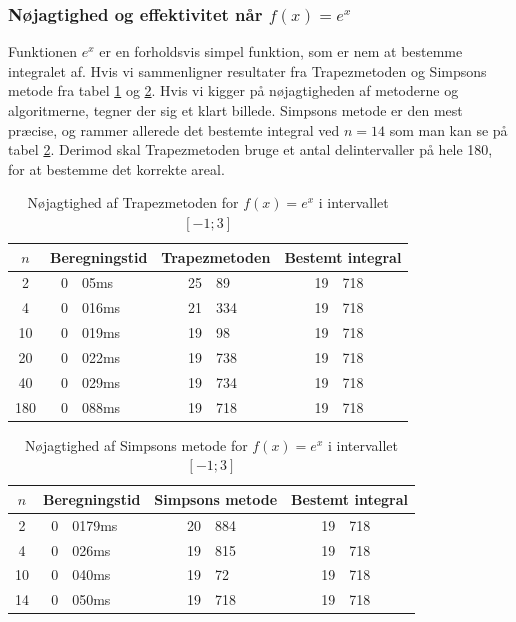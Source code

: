 \documentclass[12pt]{article}
\numberwithin{equation}{section}
\begin{document}
\subsubsection{Nøjagtighed og effektivitet når $f(x)=e^x$}
Funktionen $e^x$ er en forholdsvis simpel funktion, som er nem at bestemme integralet af. Hvis vi sammenligner resultater fra Trapezmetoden og Simpsons metode fra tabel \ref{tab:trapezmetodenex} og \ref{tab:simpsonsmetodeex}. Hvis vi kigger på nøjagtigheden af metoderne og algoritmerne, tegner der sig et klart billede. Simpsons metode er den mest præcise, og rammer allerede det bestemte integral ved $n=14$ som man kan se på tabel \ref{tab:simpsonsmetodeex}. Derimod skal Trapezmetoden bruge et antal delintervaller på hele 180, for at bestemme det korrekte areal.
\begin{table}[H]
	\caption {Nøjagtighed af Trapezmetoden for $f(x)=e^x$ i intervallet $[-1;3]$}
	\label{tab:trapezmetodenex}
\begin{center}
\begin{tabular}{|c|r@{.}l|r @{.} l|r @{.} l|}
	\hline $n$ & \multicolumn{2}{|c|}{Beregningstid} & \multicolumn{2}{|c|}{Trapezmetoden} & \multicolumn{2}{|c|}{Bestemt integral}
	\\
	\hline 2 & 0&05ms & 25&89 & 19&718\\ 
	\hline 4 & 0&016ms & 21&334 & 19&718\\ 
	\hline 10 & 0&019ms & 19&98 & 19&718\\ 
	\hline 20 & 0&022ms & 19&738 & 19&718\\ 
	\hline 40 & 0&029ms & 19&734 & 19&718\\ 
	\hline 180 & 0&088ms & 19&718 & 19&718\\ 
	\hline 
\end{tabular}
\end{center}
\end{table}
\begin{table}[H]
	\caption {Nøjagtighed af Simpsons metode for $f(x)=e^x$ i intervallet $[-1;3]$} 
	\label{tab:simpsonsmetodeex}
	\begin{center}
		\begin{tabular}{|c|r@{.}l|r @{.} l|r @{.} l|}
			\hline $n$ & \multicolumn{2}{|c|}{Beregningstid} & \multicolumn{2}{|c|}{Simpsons metode} & \multicolumn{2}{|c|}{Bestemt integral}
			\\ 
			\hline 2 & 0&0179ms & 20&884 & 19&718\\ 
			\hline 4 & 0&026ms & 19&815 & 19&718\\ 
			\hline 10 & 0&040ms & 19&72 & 19&718\\ 
			\hline 14 & 0&050ms & 19&718 & 19&718\\ 
			\hline 
		\end{tabular}
	\end{center}
\end{table}
\end{document}

